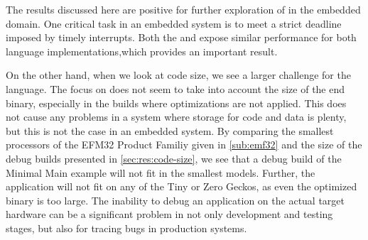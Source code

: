 The results discussed here are positive for further exploration of {\rust} in the embedded domain.
One critical task in an embedded system is to meet a strict deadline imposed by timely interrupts.
Both the {\tracker} and {\cg} expose similar performance for both language implementations,which provides an important result.

On the other hand, when we look at code size, we see a larger challenge for the {\rust} language.
The focus on  does not seem to take into account the size of the end binary, especially in the builds where optimizations are not applied.
This does not cause any problems in a system where storage for code and data is plenty, but this is not the case in an embedded system.
By comparing the smallest processors of the EFM32 Product Familiy given in \autoref{sub:emf32} and the size of the debug builds presented in \autoref{sec:res:code-size}, we see that a debug build of the Minimal Main example will not fit in the smallest models.
Further, the {\tracker} application will not fit on any of the Tiny or Zero Geckos, as even the optimized binary is too large.
The inability to debug an application on the actual target hardware can be a significant problem in not only development and testing stages, but also for tracing bugs in production systems.
